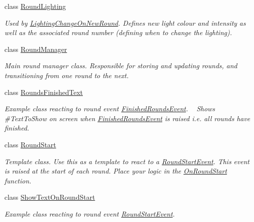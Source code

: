 \begin{DoxyCompactItemize}
class \hyperlink{class_round_manager_1_1_round_lighting}{Round\+Lighting}
\begin{DoxyCompactList}\small\item\em Used by \hyperlink{class_round_manager_1_1_lighting_change_on_new_round}{Lighting\+Change\+On\+New\+Round}. Defines new light colour and intensity as well as the associated round number (defining when to change the lighting). \end{DoxyCompactList}\item 
class \hyperlink{class_round_manager_1_1_round_manager}{Round\+Manager}
\begin{DoxyCompactList}\small\item\em Main round manager class. Responsible for storing and updating rounds, and transitioning from one round to the next. \end{DoxyCompactList}\item 
class \hyperlink{class_round_manager_1_1_rounds_finished_text}{Rounds\+Finished\+Text}
\begin{DoxyCompactList}\small\item\em Example class reacting to round event \hyperlink{class_round_manager_1_1_events_1_1_finished_rounds_event}{Finished\+Rounds\+Event}. ~\newline
Shows \#\+Text\+To\+Show on screen when \hyperlink{class_round_manager_1_1_events_1_1_finished_rounds_event}{Finished\+Rounds\+Event} is raised i.\+e. all rounds have finished. \end{DoxyCompactList}\item 
class \hyperlink{class_round_manager_1_1_round_start}{Round\+Start}
\begin{DoxyCompactList}\small\item\em Template class. Use this as a template to react to a \hyperlink{class_round_manager_1_1_events_1_1_round_start_event}{Round\+Start\+Event}. This event is raised at the start of each round. Place your logic in the \hyperlink{class_round_manager_1_1_round_start_adbe6efdca2f652400ee7afe113a7645b}{On\+Round\+Start} function. \end{DoxyCompactList}\item 
class \hyperlink{class_round_manager_1_1_show_text_on_round_start}{Show\+Text\+On\+Round\+Start}
\begin{DoxyCompactList}\small\item\em Example class reacting to round event \hyperlink{class_round_manager_1_1_events_1_1_round_start_event}{Round\+Start\+Event}. ~\newline

\end{DoxyCompactList}
\end{DoxyCompactItemize}
